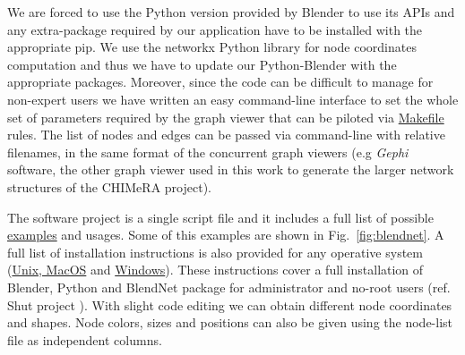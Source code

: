 \documentclass{standalone}
\begin{document}
We are forced to use the \textsf{Python} version provided by \textsf{Blender} to use its APIs and any extra-package required by our application have to be installed with the appropriate \textsf{pip}.
We use the \textsf{networkx} \textsf{Python} library for node coordinates computation and thus we have to update our \textsf{Python}-\textsf{Blender} with the appropriate packages.
Moreover, since the code can be difficult to manage for non-expert users we have written an easy command-line interface to set the whole set of parameters required by the graph viewer that can be piloted via \href{https://github.com/Nico-Curti/BlendNet/blob/master/Makefile}{\textsf{Makefile}} rules.
The list of nodes and edges can be passed via command-line with relative filenames, in the same format of the concurrent graph viewers (e.g \emph{Gephi} software, the other graph viewer used in this work to generate the larger network structures of the \textsf{CHIMeRA} project).

The software project is a single script file and it includes a full list of possible \href{https://github.com/Nico-Curti/BlendNet/blob/master/example}{examples} and usages.
Some of this examples are shown in Fig.~\ref{fig:blendnet}.
A full list of installation instructions is also provided for any operative system (\href{https://github.com/Nico-Curti/BlendNet/blob/master/install.sh}{Unix, MacOS} and \href{https://github.com/Nico-Curti/BlendNet/blob/master/install.ps1}{Windows}).
These instructions cover a full installation of \textsf{Blender}, \textsf{Python} and \textsf{BlendNet} package for administrator and no-root users (ref. \textsf{Shut} project \cite{Shut}).
With slight code editing we can obtain different node coordinates and shapes.
Node colors, sizes and positions can also be given using the node-list file as independent columns.
\end{document}

